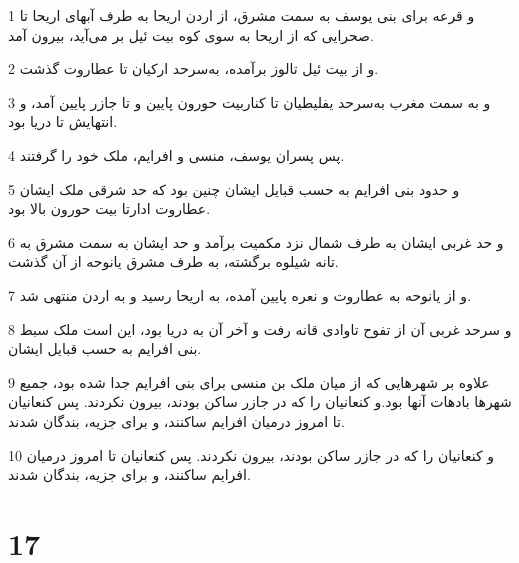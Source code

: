 \par 1 و قرعه برای بنی یوسف به سمت مشرق، از اردن اریحا به طرف آبهای اریحا تا صحرایی که از اریحا به سوی کوه بیت ئیل بر می‌آید، بیرون آمد.
\par 2 و از بیت ئیل تالوز برآمده، به‌سرحد ارکیان تا عطاروت گذشت.
\par 3 و به سمت مغرب به‌سرحد یفلیطیان تا کناربیت حورون پایین و تا جازر پایین آمد، و انتهایش تا دریا بود.
\par 4 پس پسران یوسف، منسی و افرایم، ملک خود را گرفتند.
\par 5 و حدود بنی افرایم به حسب قبایل ایشان چنین بود که حد شرقی ملک ایشان عطاروت ادارتا بیت حورون بالا بود.
\par 6 و حد غربی ایشان به طرف شمال نزد مکمیت برآمد و حد ایشان به سمت مشرق به تانه شیلوه برگشته، به طرف مشرق یانوحه از آن گذشت.
\par 7 و از یانوحه به عطاروت و نعره پایین آمده، به اریحا رسید و به اردن منتهی شد.
\par 8 و سرحد غربی آن از تفوح تاوادی قانه رفت و آخر آن به دریا بود، این است ملک سبط بنی افرایم به حسب قبایل ایشان.
\par 9 علاوه بر شهرهایی که از میان ملک بن منسی برای بنی افرایم جدا شده بود، جمیع شهرها بادهات آنها بود.و کنعانیان را که در جازر ساکن بودند، بیرون نکردند. پس کنعانیان تا امروز درمیان افرایم ساکنند، و برای جزیه، بندگان شدند.
\par 10 و کنعانیان را که در جازر ساکن بودند، بیرون نکردند. پس کنعانیان تا امروز درمیان افرایم ساکنند، و برای جزیه، بندگان شدند.
 
\chapter{17}

